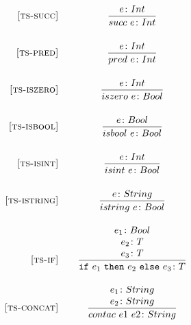 \documentclass[addpoints]{exam}
\begin{document}
\[
  \begin{array}{r@{\qquad}c}
    \ssrule{ts-succ}{
        \tstep{e}{Int}
    }{
        \tstep{succ~e}{Int}
    }
    \ssrule{ts-pred}{
        \tstep{e}{Int}
    }{
        \tstep{pred~e}{Int}
    }
    \ssrule{ts-iszero}{
        \tstep{e}{Int}
    }{
        \tstep{iszero~e}{Bool}
    }
    \ssrule{ts-isbool}{
        \tstep{e}{Bool}
    }{
        \tstep{isbool~e}{Bool}
    }
    \ssrule{ts-isint}{
        \tstep{e}{Int}
    }{
        \tstep{isint~e}{Bool}
    }
    \ssrule{ts-istring}{
        \tstep{e}{String}
    }{
        \tstep{istring~e}{Bool}
    }
    \ssrule{ts-if}{
        \tstep{e_1}{Bool} \\
        \tstep{e_2}{T} \\
        \tstep{e_3}{T}
    }{
        \tstep{\ife{e_1}{e_2}{e_3}}{T}
    }
    \ssrule{ts-concat}{
        \tstep{e_1}{String} \\
        \tstep{e_2}{String}
    }{
        \tstep{contac~e1~e2}{String}
    }
    
  \end{array}
\]
\end{document}

